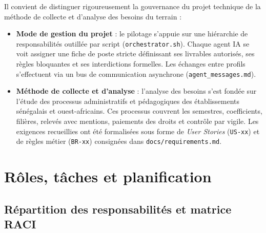 Il convient de distinguer rigoureusement la gouvernance du projet technique de la méthode de collecte et d'analyse des besoins du terrain :
\begin{itemize}
    \item \textbf{Mode de gestion du projet} : le pilotage s'appuie sur une hiérarchie de responsabilités outillée par script (\texttt{orchestrator.sh}). Chaque agent IA se voit assigner une fiche de poste stricte définissant ses livrables autorisés, ses règles bloquantes et ses interdictions formelles. Les échanges entre profils s'effectuent via un bus de communication asynchrone (\texttt{agent\_messages.md}).
    \item \textbf{Méthode de collecte et d'analyse} : l'analyse des besoins s'est fondée sur l'étude des processus administratifs et pédagogiques des établissements sénégalais et ouest-africains. Ces processus couvrent les semestres, coefficients, filières, relevés avec mentions, paiements des droits et contrôle par vigile. Les exigences recueillies ont été formalisées sous forme de \emph{User Stories} (\texttt{US-xx}) et de règles métier (\texttt{BR-xx}) consignées dans \nolinkurl{docs/requirements.md}.
\end{itemize}

\section{Rôles, tâches et planification}

\subsection{Répartition des responsabilités et matrice RACI}

